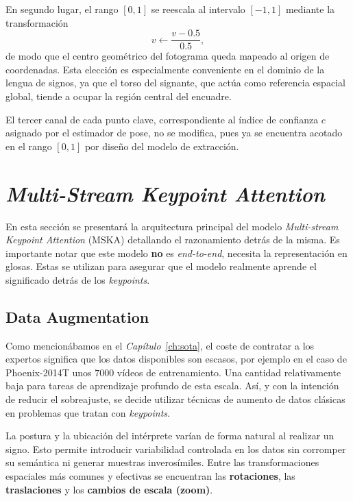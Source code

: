 En segundo lugar, el rango $[0,1]$ se reescala al intervalo $[-1,1]$ mediante la transformación \begin{equation*}v \leftarrow \frac{v - 0.5}{0.5},\end{equation*} de modo que el centro geométrico del fotograma queda mapeado al origen de coordenadas.
Esta elección es especialmente conveniente en el dominio de la lengua de signos, ya que el torso del signante, que actúa como referencia espacial global, tiende a ocupar la región central del encuadre.

El tercer canal de cada punto clave, correspondiente al índice de confianza $c$ asignado por el estimador de pose, no se modifica, pues ya se encuentra acotado en el rango $[0,1]$ por diseño del modelo de extracción.

\section{\textit{Multi-Stream Keypoint Attention}}
En esta sección se presentará la arquitectura principal del modelo \textit{Multi-stream Keypoint Attention} (MSKA) detallando el razonamiento detrás de la misma.
Es importante notar que este modelo \textbf{no} es \textit{end-to-end}, necesita la representación en glosas.
Estas se utilizan para asegurar que el modelo realmente aprende el significado detrás de los \textit{keypoints}.

\subsection{Data Augmentation}\label{sec:DATAAUG}
Como mencionábamos en el \textit{Capítulo}~\ref{ch:sota}, el coste de contratar a los expertos significa que los datos disponibles son escasos, por ejemplo en el caso de Phoenix-2014T unos $7000$ vídeos de entrenamiento.
Una cantidad relativamente baja para tareas de aprendizaje profundo de esta escala.
Así, y con la intención de reducir el sobreajuste, se decide utilizar técnicas de aumento de datos clásicas en problemas que tratan con \textit{keypoints}.

La postura y la ubicación del intérprete varían de forma natural al realizar un signo.
Esto permite introducir variabilidad controlada en los datos sin corromper su semántica ni generar muestras inverosímiles.
Entre las transformaciones espaciales más comunes y efectivas se encuentran las \textbf{rotaciones}, las \textbf{traslaciones} y los \textbf{cambios de escala (zoom)}.

